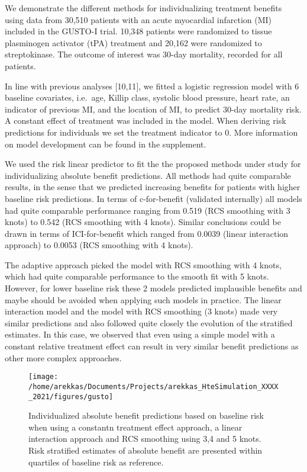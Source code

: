 \documentclass{article}
\begin{document}
We demonstrate the different methods for individualizing treatment
benefits using data from 30,510 patients with an acute myocardial
infarction (MI) included in the GUSTO-I trial. 10,348 patients were
randomized to tissue plasminogen activator (tPA) treatment and 20,162
were randomized to streptokinase. The outcome of interest was 30-day
mortality, recorded for all patients.

In line with previous analyses {[}10,11{]}, we fitted a logistic
regression model with 6 baseline covariates, i.e.~age, Killip class,
systolic blood pressure, heart rate, an indicator of previous MI, and
the location of MI, to predict 30-day mortality risk. A constant effect
of treatment was included in the model. When deriving risk predictions
for individuals we set the treatment indicator to 0. More information on
model development can be found in the supplement.

We used the risk linear predictor to fit the the proposed methods under
study for individualizing absolute benefit predictions. All methods had
quite comparable results, in the sense that we predicted increasing
benefits for patients with higher baseline risk predictions. In terms of
c-for-benefit (validated internally) all models had quite comparable
performance ranging from 0.519 (RCS smoothing with 3 knots) to 0.542
(RCS smoothing with 4 knots). Similar conclusions could be drawn in
terms of ICI-for-benefit which ranged from 0.0039 (linear interaction
approach) to 0.0053 (RCS smoothing with 4 knots).

The adaptive approach picked the model with RCS smoothing with 4 knots,
which had quite comparable performance to the smooth fit with 5 knots.
However, for lower baseline risk these 2 models predicted implausible
benefits and maybe should be avoided when applying such models in
practice. The linear interaction model and the model with RCS smoothing
(3 knots) made very similar predictions and also followed quite closely
the evolution of the stratified estimates. In this case, we observed
that even using a simple model with a constant relative treatment effect
can result in very similar benefit predictions as other more complex
approaches.

\begin{figure}
\texttt{[image: /home/arekkas/Documents/Projects/arekkas\_HteSimulation\_XXXX\_2021/figures/gusto]} \caption{Individualized absolute benefit predictions based on baseline risk when using a constantn treatment effect approach, a linear interaction approach and RCS smoothing using 3,4 and 5 knots. Risk stratified estimates of absolute benefit are presented within quartiles of baseline risk as reference.}\label{fig:gusto}
\end{figure}
\end{document}
